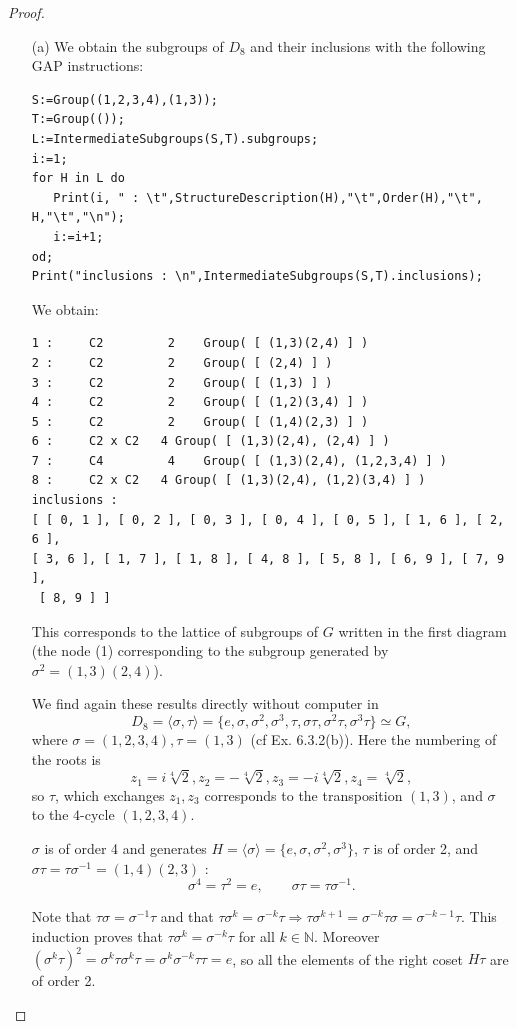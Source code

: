 \documentclass[11pt,a4paper]{article}
\newcommand{\N}{\mathbb{N}}
\begin{document}
\begin{proof}
\begin{enumerate}
\item[(a)]
We obtain the subgroups of $D_8$ and their inclusions with the following GAP instructions:
\begin{verbatim}
S:=Group((1,2,3,4),(1,3));
T:=Group(());
L:=IntermediateSubgroups(S,T).subgroups;
i:=1;
for H in L do
   Print(i, " : \t",StructureDescription(H),"\t",Order(H),"\t", H,"\t","\n");
   i:=i+1;
od;
Print("inclusions : \n",IntermediateSubgroups(S,T).inclusions);
\end{verbatim}
We obtain:
\begin{verbatim}
1 : 	C2	       2	Group( [ (1,3)(2,4) ] )	
2 : 	C2	       2	Group( [ (2,4) ] )	
3 : 	C2	       2	Group( [ (1,3) ] )	
4 : 	C2	       2	Group( [ (1,2)(3,4) ] )	
5 : 	C2	       2	Group( [ (1,4)(2,3) ] )	
6 : 	C2 x C2   4	Group( [ (1,3)(2,4), (2,4) ] )	
7 : 	C4	       4	Group( [ (1,3)(2,4), (1,2,3,4) ] )	
8 : 	C2 x C2   4	Group( [ (1,3)(2,4), (1,2)(3,4) ] )
inclusions : 
[ [ 0, 1 ], [ 0, 2 ], [ 0, 3 ], [ 0, 4 ], [ 0, 5 ], [ 1, 6 ], [ 2, 6 ], 
[ 3, 6 ], [ 1, 7 ], [ 1, 8 ], [ 4, 8 ], [ 5, 8 ], [ 6, 9 ], [ 7, 9 ],
 [ 8, 9 ] ]
\end{verbatim}
This corresponds to the lattice of subgroups of $G$ written in the first diagram (the node (1) corresponding to the subgroup generated by $\sigma^2 = (1,3)(2,4)$).

We find again these results directly without computer in $$D_8 = \langle \sigma, \tau  \rangle = \{e, \sigma, \sigma^2, \sigma^3, \tau, \sigma \tau, \sigma^2 \tau, \sigma^3 \tau\}\simeq G,$$ where $\sigma = (1,2,3,4), \tau = (1,3)$ (cf Ex. 6.3.2(b)).  Here the numbering of the roots is $$z_1 = i\sqrt[4]{2},z_2 =  - \sqrt[4]{2}, z_3 = -i  \sqrt[4]{2}, z_4 = \sqrt[4]{2}, $$so $\tau$, which exchanges $z_1,z_3$ corresponds to the transposition $(1,3)$, and $\sigma$ to the $4$-cycle $(1,2,3,4)$.

$\sigma$ is of order 4 and generates $H =\langle  \sigma \rangle =\{e,\sigma, \sigma^2,\sigma^3\}$, $\tau$ is of order 2, and $\sigma \tau = \tau \sigma^{-1} =(1,4)(2,3)$ :
$$\sigma^4 = \tau ^2 = e,\qquad \sigma \tau = \tau \sigma^{-1}.$$

Note that $\tau \sigma = \sigma^{-1} \tau$ and that $\tau \sigma^k = \sigma^{-k} \tau \Rightarrow \tau \sigma^{k+1} = \sigma^{-k} \tau \sigma = \sigma^{-k-1} \tau$. This induction proves that $\tau \sigma^k = \sigma^{-k} \tau$ for all $k \in \N$. Moreover $(\sigma^k \tau)^2 = \sigma^k \tau \sigma^k \tau = \sigma^k \sigma^{-k} \tau \tau =e$, so all the elements of the right coset $H\tau$ are of order 2.


\end{enumerate}
\end{proof}
\end{document}
